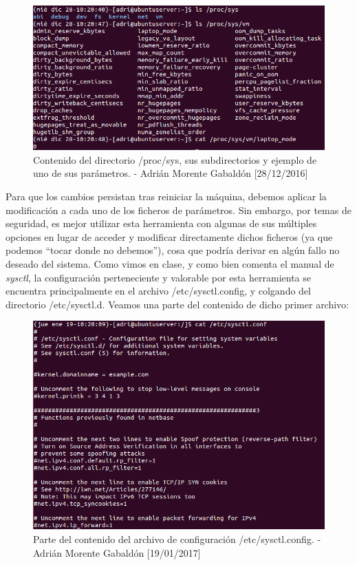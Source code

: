\begin{figure}[H]
	\centering
	\includegraphics[scale=0.7]{proc-sys}
	\caption{Contenido del directorio /proc/sys, sus subdirectorios y ejemplo de uno de sus parámetros. - Adrián
	Morente Gabaldón [28/12/2016]}
	\label{figura3}
\end{figure}
Para que los cambios persistan tras reiniciar la máquina, debemos aplicar la modificación a cada uno de los ficheros
de parámetros. Sin embargo, por temas de seguridad, es mejor utilizar esta herramienta con algunas de sus múltiples
opciones en lugar de acceder y modificar directamente dichos ficheros (ya que podemos ``tocar donde no debemos''),
cosa que podría derivar en algún fallo no deseado del sistema.
Como vimos en clase, y como bien comenta el manual de \emph{sysctl}, la configuración perteneciente y valorable por
esta herramienta se encuentra principalmente en el archivo /etc/sysctl.config, y colgando del directorio /etc/sysctl.d.
Veamos una parte del contenido de dicho primer archivo:
\begin{figure}[H]
	\centering
	\includegraphics[scale=0.36]{sysctl-conf}
	\caption{Parte del contenido del archivo de configuración /etc/sysctl.config. - Adrián Morente Gabaldón [19/01/2017]}
	\label{figura5}
\end{figure}
